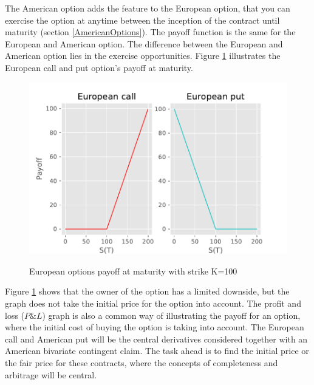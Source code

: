 The American option adds the feature to the European option, that you can exercise the option at anytime between the inception of the contract until maturity (section \ref{AmericanOptions}). The payoff function is the same for the European and American option. The difference between the European and American option lies in the exercise opportunities. Figure \ref{fig:contractfct} illustrates the European call and put option's payoff at maturity. 

\begin{figure}[H]
\centering
\includegraphics{Figures/contractfct.pdf}\\
\decoRule
\caption[Contract Functions]{European options payoff at maturity with strike K=100}
\label{fig:contractfct}
\end{figure}

Figure \ref{fig:contractfct} shows that the owner of the option has a limited downside, but the graph does not take the initial price for the option into account. The profit and loss ($P\& L$) graph is also a common way of illustrating the payoff for an option, where the initial cost of buying the option is taking into account. The European call and American put will be the central derivatives considered together with an American bivariate contingent claim. The task ahead is to find the initial price or the fair price for these contracts, where the concepts of completeness and arbitrage will be central.


